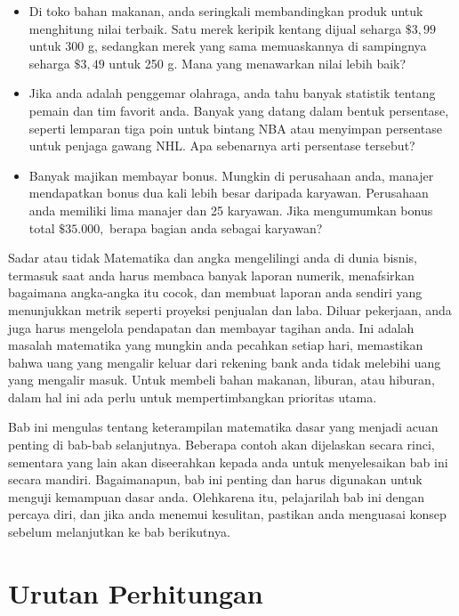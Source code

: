 \documentclass[
]{book}
\providecommand{\tightlist}{%
  \setlength{\itemsep}{0pt}\setlength{\parskip}{0pt}}
\begin{document}
\begin{itemize}
\tightlist
\item
  Di toko bahan makanan, anda seringkali membandingkan produk untuk menghitung nilai terbaik. Satu merek keripik kentang dijual seharga \(\$ 3,99\) untuk 300 g, sedangkan merek yang sama memuaskannya di sampingnya seharga \(\$ 3,49\) untuk 250 g. Mana yang menawarkan nilai lebih baik?
\item
  Jika anda adalah penggemar olahraga, anda tahu banyak statistik tentang pemain dan tim favorit anda. Banyak yang datang dalam bentuk persentase, seperti lemparan tiga poin untuk bintang NBA atau menyimpan persentase untuk penjaga gawang NHL. Apa sebenarnya arti persentase tersebut?
\item
  Banyak majikan membayar bonus. Mungkin di perusahaan anda, manajer mendapatkan bonus dua kali lebih besar daripada karyawan. Perusahaan anda memiliki lima manajer dan 25 karyawan. Jika mengumumkan bonus total \(\$ 35.000,\) berapa bagian anda sebagai karyawan?
\end{itemize}

Sadar atau tidak Matematika dan angka mengelilingi anda di dunia bisnis, termasuk saat anda harus membaca banyak laporan numerik, menafsirkan bagaimana angka-angka itu cocok, dan membuat laporan anda sendiri yang menunjukkan metrik seperti proyeksi penjualan dan laba. Diluar pekerjaan, anda juga harus mengelola pendapatan dan membayar tagihan anda. Ini adalah masalah matematika yang mungkin anda pecahkan setiap hari, memastikan bahwa uang yang mengalir keluar dari rekening bank anda tidak melebihi uang yang mengalir masuk. Untuk membeli bahan makanan, liburan, atau hiburan, dalam hal ini ada perlu untuk mempertimbangkan prioritas utama.

Bab ini mengulas tentang keterampilan matematika dasar yang menjadi acuan penting di bab-bab selanjutnya. Beberapa contoh akan dijelaskan secara rinci, sementara yang lain akan diseerahkan kepada anda untuk menyelesaikan bab ini secara mandiri. Bagaimanapun, bab ini penting dan harus digunakan untuk menguji kemampuan dasar anda. Olehkarena itu, pelajarilah bab ini dengan percaya diri, dan jika anda menemui kesulitan, pastikan anda menguasai konsep sebelum melanjutkan ke bab berikutnya.

\hypertarget{urutan-perhitungan}{%
\section{Urutan Perhitungan}\label{urutan-perhitungan}}
\end{document}
